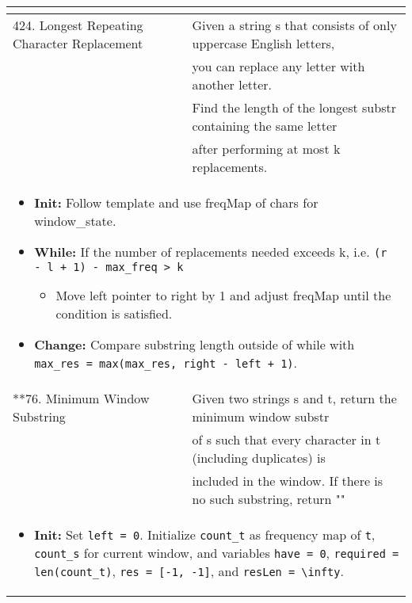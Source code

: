 \begin{summary}
\begin{center}
\begin{tabular}{ll}
{\begin{itemize}
                \end{itemize}
            } \\
            \midrule
            424. Longest Repeating Character Replacement & Given a string s that consists of only uppercase English letters, \\
            & you can replace any letter with another letter. \\
            & Find the length of the longest substr containing the same letter \\
            & after performing at most k replacements. \\
            \multicolumn{2}{p{\linewidth}}{
                \begin{itemize}
                    \item \textbf{Init:} Follow template and use freqMap of chars for window\_state.
                    \item \textbf{While:} If the number of replacements needed exceeds k, i.e. \texttt{(r - l + 1) - max\_freq > k}
                    \begin{itemize}
                        \item Move left pointer to right by 1 and adjust freqMap until the condition is satisfied.
                    \end{itemize}
                    \item \textbf{Change:} Compare substring length outside of while with \texttt{max\_res = max(max\_res, right - left + 1)}.
                \end{itemize}
            } \\
            \midrule
            **76. Minimum Window Substring & Given two strings s and t, return the minimum window substr \\
            & of s such that every character in t (including duplicates) is \\
            & included in the window. If there is no such substring, return "" \\
            \multicolumn{2}{p{\linewidth}}{
                \begin{itemize}
                    \item \textbf{Init:} Set \texttt{left = 0}. Initialize \texttt{count\_t} as frequency map of \texttt{t}, \texttt{count\_s} for current window, and variables \texttt{have = 0}, \texttt{required = len(count\_t)}, \texttt{res = [-1, -1]}, and \texttt{resLen = \textbackslash infty}.
                    

\end{itemize}}
\end{tabular}
\end{center}
\end{summary}
